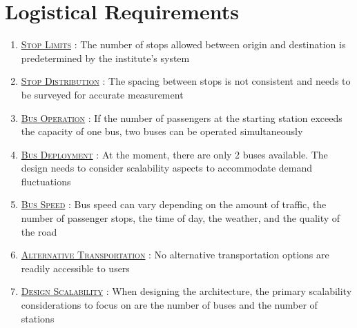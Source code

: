 \section{Logistical Requirements}

\begin{enumerate}

\item {}\underline{\textsc{Stop Limits}} : The number of stops allowed between origin and destination is predetermined by the institute's system

\item \underline{\textsc{Stop Distribution}} : The spacing between stops is not consistent and needs to be surveyed for accurate measurement

\item \underline{\textsc{Bus Operation}} : If the number of passengers at the starting station exceeds the capacity of one bus, two buses can be operated simultaneously

\item \underline{\textsc{Bus Deployment}} : At the moment, there are only 2 buses available. The design needs to consider scalability aspects to accommodate demand fluctuations

\item \underline{\textsc{Bus Speed}} : Bus speed can vary depending on the amount of traffic, the number of passenger stops, the time of day, the weather, and the quality of the road

\item \underline{\textsc{Alternative Transportation}} : No alternative transportation options are readily accessible to users

\item {}\underline{\textsc{Design Scalability}} : When designing the architecture, the primary scalability considerations to focus on are the number of buses and the number of stations
\end{enumerate}